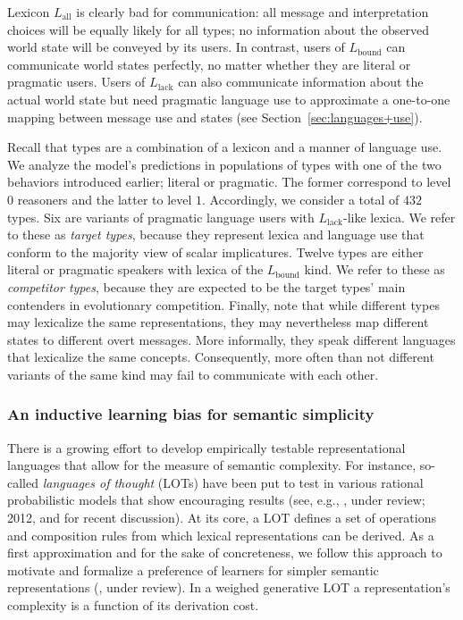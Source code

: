 \documentclass[a4paper, 11pt]{article}
\theoremstyle{Satz}
\newcommand{\mylang}[1]{\ensuremath{L_{\text{#1}}}\xspace} %
\newcommand{\Lall}{\mylang{all}}
\newcommand{\Lbound}{\mylang{bound}}
\newcommand{\Llack}{\mylang{lack}}
\begin{document}
Lexicon $\Lall$ is clearly bad for communication: all message and interpretation choices will
be equally likely for all types; no information about the observed world state will be conveyed
by its users. In contrast, users of $\Lbound$ can communicate world states perfectly, no matter
whether they are literal or pragmatic users. Users of $\Llack$ can also communicate information
about the actual world state but need pragmatic language use to approximate a one-to-one
mapping between message use and states (see Section~\ref{sec:languages+use}).  

Recall that types are a combination of a lexicon and a manner of language use. We analyze the
model's predictions in populations of types with one of the two behaviors introduced earlier;
literal or pragmatic. The former correspond to level $0$ reasoners and the latter to level
$1$. Accordingly, we consider a total of $432$ types. Six are variants of pragmatic language
users with $\Llack$-like lexica. We refer to these as \emph{target types}, because they
represent lexica and language use that conform to the majority view of scalar
implicatures. Twelve types are either literal or pragmatic speakers with lexica of the
$\Lbound$ kind. We refer to these as \emph{competitor types}, because they are expected to be
the target types' main contenders in evolutionary competition. Finally, note that while
different types may lexicalize the same representations, they may nevertheless map different
states to different overt messages. More informally, they speak different languages that
lexicalize the same concepts. Consequently, more often than not different variants of the same
kind may fail to communicate with each other.




\subsubsection{An inductive learning bias for semantic simplicity}
\label{sec:an-induct-learn}

There is a growing effort to develop empirically testable representational languages that allow
for the measure of semantic complexity. For instance, so-called {\em languages of thought}
(LOTs) have been put to test in various rational probabilistic models that show encouraging
results (see, e.g., \citealt{katz+etal:2008}, \citeauthor{piantadosi+etal:underreview} under review; 2012, and \citealt{piantadosi+jacobs:2016} for recent discussion). At its
core, a LOT defines a set of operations and composition rules from which lexical representations can be
derived. As a first approximation and for the sake of concreteness, we follow this approach to
motivate and formalize a preference of learners for simpler semantic representations
(\citealt{feldman:2000, chater+vitanyi:2003, piantadosi+etal:2012a,kirby+etal:2015}, \citeauthor{piantadosi+etal:underreview} under review). 
In a weighed generative LOT a representation's complexity is a function of its derivation cost.
\end{document}
